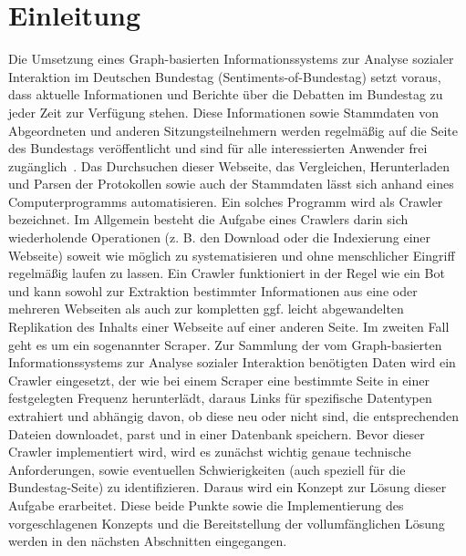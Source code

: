 \section{Einleitung}\label{sec:02_01_einleitung}
Die Umsetzung eines Graph-basierten Informationssystems zur Analyse sozialer
Interaktion im Deutschen Bundestag (Sentiments-of-Bundestag) setzt voraus, dass aktuelle Informationen und Berichte über die Debatten im Bundestag zu jeder Zeit zur Verfügung stehen. Diese Informationen sowie Stammdaten von Abgeordneten und anderen Sitzungsteilnehmern werden regelmäßig auf die Seite des Bundestags veröffentlicht und sind für alle interessierten Anwender frei zugänglich~\cite{OpenData2019}. Das Durchsuchen dieser Webseite, das Vergleichen, Herunterladen und Parsen der Protokollen sowie auch der Stammdaten lässt sich anhand eines Computerprogramms automatisieren. Ein solches Programm wird als Crawler bezeichnet. Im Allgemein besteht die Aufgabe eines Crawlers darin sich wiederholende Operationen (z. B. den Download oder die Indexierung einer Webseite) soweit wie möglich zu systematisieren und ohne menschlicher Eingriff regelmäßig laufen zu lassen. Ein Crawler funktioniert in der Regel wie ein Bot und kann sowohl zur Extraktion bestimmter Informationen aus eine oder mehreren Webseiten als auch zur kompletten ggf. leicht abgewandelten Replikation des Inhalts einer Webseite auf einer anderen Seite. Im zweiten Fall geht es um ein sogenannter Scraper. Zur Sammlung der vom Graph-basierten Informationssystems zur Analyse sozialer
Interaktion benötigten Daten wird ein Crawler eingesetzt, der wie bei einem Scraper eine bestimmte Seite in einer festgelegten Frequenz herunterlädt, daraus Links für spezifische Datentypen extrahiert und abhängig davon, ob diese neu oder nicht sind, die entsprechenden Dateien downloadet, parst und in einer Datenbank speichern. Bevor dieser Crawler implementiert wird, wird es zunächst wichtig genaue technische Anforderungen, sowie eventuellen Schwierigkeiten (auch speziell für die Bundestag-Seite) zu identifizieren. Daraus wird ein Konzept zur Lösung dieser Aufgabe erarbeitet. Diese beide Punkte sowie die Implementierung des vorgeschlagenen Konzepts und die Bereitstellung der vollumfänglichen Lösung werden in den nächsten Abschnitten eingegangen.